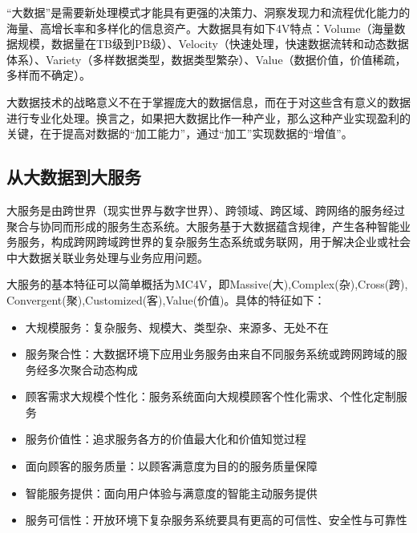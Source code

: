 \documentclass[11pt,a4paper]{article}
\begin{document}
\begin{CJK}{UTF8}{gbsn}
“大数据”是需要新处理模式才能具有更强的决策力、洞察发现力和流程优化能力的海量、高增长率和多样化的信息资产。大数据具有如下4V特点：Volume（海量数据规模，数据量在TB级到PB级）、Velocity（快速处理，快速数据流转和动态数据体系）、Variety（多样数据类型，数据类型繁杂）、Value（数据价值，价值稀疏，多样而不确定）。

大数据技术的战略意义不在于掌握庞大的数据信息，而在于对这些含有意义的数据进行专业化处理。换言之，如果把大数据比作一种产业，那么这种产业实现盈利的关键，在于提高对数据的“加工能力”，通过“加工”实现数据的“增值”。

\subsection{从大数据到大服务}

大服务是由跨世界（现实世界与数字世界）、跨领域、跨区域、跨网络的服务经过聚合与协同而形成的服务生态系统。大服务基于大数据蕴含规律，产生各种智能业务服务，构成跨网跨域跨世界的复杂服务生态系统或务联网，用于解决企业或社会中大数据关联业务处理与业务应用问题。

大服务的基本特征可以简单概括为MC4V，即Massive(大),Complex(杂),Cross(跨), Convergent(聚),Customized(客),Value(价值)。具体的特征如下：

\begin{itemize}

\item 大规模服务：复杂服务、规模大、类型杂、来源多、无处不在
\item 服务聚合性：大数据环境下应用业务服务由来自不同服务系统或跨网跨域的服务经多次聚合动态构成
\item  顾客需求大规模个性化：服务系统面向大规模顾客个性化需求、个性化定制服务
\item 服务价值性：追求服务各方的价值最大化和价值知觉过程
\item 面向顾客的服务质量：以顾客满意度为目的的服务质量保障
\item 智能服务提供：面向用户体验与满意度的智能主动服务提供
\item 服务可信性：开放环境下复杂服务系统要具有更高的可信性、安全性与可靠性

\end{itemize}

\clearpage\end{CJK}
\end{document}
